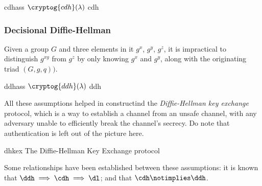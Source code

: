 \begin{cryptogame}
    {cdhass}
    {$\cryptog{cdh}(\lambda)$}
    {cdh}


    
\end{cryptogame}

\subsubsection{Decisional Diffie-Hellman}

Given a group $G$ and three elements in it $g^x$, $g^y$, $g^z$, it is impractical to distinguish $g^{xy}$ from $g^z$ by only knowing $g^x$ and $g^y$, along with the originating triad $(G, g, q))$.

\begin{cryptogame}
    {ddhass}
    {$\cryptog{ddh}(\lambda)$}
    {ddh}

    \cseqdelay


    \cseqdelay

    
\end{cryptogame}

All these assumptions helped in constructind the \emph{Diffie-Hellman key exchange} protocol, which is a way to establish a \ske{} channel from an unsafe channel, with any adversary unable to efficiently break the channel's secrecy. Do note that authentication is left out of the picture here.

\begin{cryptosequence}
    {dhkex}
    {The Diffie-Hellman Key Exchange protocol}
    


    \cseqdelay


\end{cryptosequence}

Some relationships have been established between these assumptions: it is known that $\ddh \implies \cdh \implies \dl$; and that $\cdh \notimplies \ddh$.
